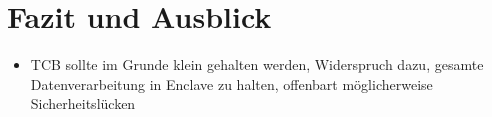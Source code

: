 
\chapter{Fazit und Ausblick}


\begin{itemize}
	\item TCB sollte im Grunde klein gehalten werden, Widerspruch dazu, gesamte Datenverarbeitung in Enclave zu halten, offenbart möglicherweise Sicherheitslücken
\end{itemize}
